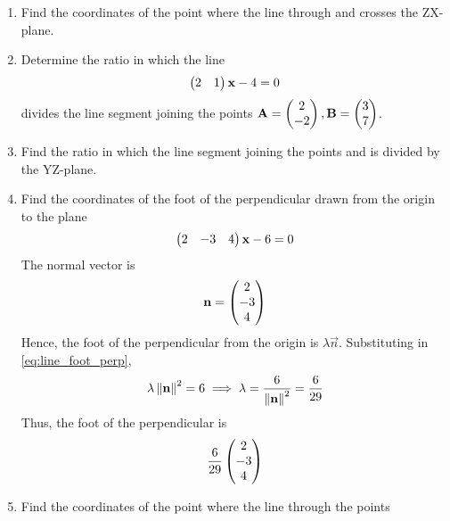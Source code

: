 \documentclass[journal,12pt,twocolumn]{IEEEtran}
\renewcommand\thesection{\arabic{section}}
\begin{document}
\begin{enumerate}[label=\thesection.\arabic*.,ref=\thesection.\theenumi]
\item Find the coordinates of the point where the line through  and  crosses the ZX-plane.
\\
\solution
%
%
\item Determine the ratio in which the line 
\begin{align}
\begin{pmatrix}2 & 1\end{pmatrix}\mathbf{x} - 4 = 0
\end{align}
%
divides the line segment joining the points $\mathbf{A}=\begin{pmatrix}2\\-2\end{pmatrix}, \mathbf{B}=\begin{pmatrix}3\\7\end{pmatrix}$.
\item Find the ratio in which the line segment joining the points  and  is divided by the YZ-plane.
%
\\
\solution
%
%
\item Find the coordinates of the foot of the perpendicular drawn from the origin to the plane 
\begin{align}
\label{eq:line_foot_perp}
\begin{pmatrix}2 & -3 & 4\end{pmatrix}\mathbf{x}-6  = 0
\end{align}
%
\solution The normal vector is 
%
\begin{align}
\mathbf{n}=\begin{pmatrix}2 \\ -3 \\ 4\end{pmatrix}
\end{align}
%
Hence, the foot of the perpendicular from the origin is $\lambda \vec{n}$.  Substituting in \eqref{eq:line_foot_perp},
\begin{align}
\lambda \left\lVert\mathbf{n}\right\rVert^2 = 6  \implies \lambda = \frac{6}{\left\lVert\mathbf{n}\right\rVert^2} = \frac{6}{29}
\end{align}
%
Thus, the foot of the perpendicular is
%
\begin{align}
\frac{6}{29}\begin{pmatrix}2 \\ -3 \\ 4\end{pmatrix}
\end{align}
%
\item Find the coordinates of the point where the line through the points

\end{enumerate}
\end{document}
